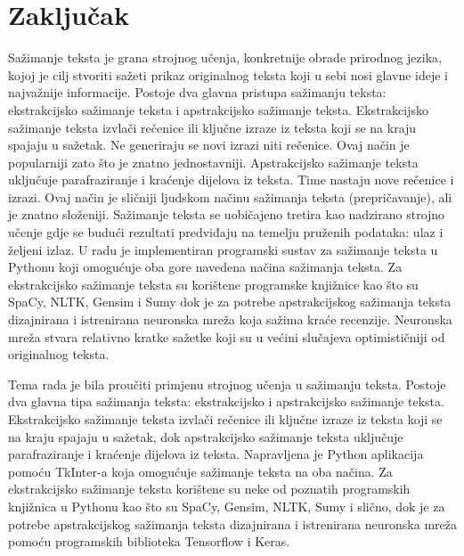 \documentclass[times, utf8, zavrsni, numeric]{fer}
\begin{document}
\chapter{Zaključak}
Sažimanje teksta je grana strojnog učenja, konkretnije obrade prirodnog jezika, kojoj je cilj stvoriti sažeti prikaz originalnog teksta koji u sebi nosi glavne ideje i najvažnije informacije.
Postoje dva glavna pristupa sažimanju teksta: ekstrakcijsko sažimanje teksta i apstrakcijsko sažimanje teksta.
Ekstrakcijsko sažimanje teksta izvlači rečenice ili ključne izraze iz teksta koji se na kraju spajaju u sažetak. Ne generiraju se novi izrazi niti rečenice. Ovaj način je popularniji zato što je znatno jednostavniji.
Apstrakcijsko sažimanje teksta uključuje parafraziranje i kraćenje dijelova iz teksta. Time nastaju nove rečenice i izrazi. Ovaj način je sličniji ljudskom načinu sažimanja teksta (prepričavanje), ali je znatno složeniji.
Sažimanje teksta se uobičajeno tretira kao nadzirano strojno učenje gdje se budući rezultati predviđaju na temelju pruženih podataka: ulaz i željeni izlaz.
U radu je implementiran programski sustav za sažimanje teksta u Pythonu koji omogućuje oba gore navedena načina sažimanja teksta.
Za ekstrakcijsko sažimanje teksta su korištene programske knjižnice kao što su SpaCy, NLTK, Gensim i Sumy dok je za potrebe apstrakcijskog sažimanja teksta dizajnirana i istrenirana neuronska mreža koja sažima kraće recenzije.
Neuronska mreža stvara relativno kratke sažetke koji su u većini slučajeva optimističniji od originalnog teksta.





\begin{sazetak}
Tema rada je bila proučiti primjenu strojnog učenja u sažimanju teksta. Postoje dva glavna tipa sažimanja teksta: ekstrakcijsko i apstrakcijsko sažimanje teksta.
Ekstrakcijsko sažimanje teksta izvlači rečenice ili ključne izraze iz teksta koji se na kraju spajaju u sažetak, dok apstrakcijsko sažimanje teksta uključuje parafraziranje i kraćenje dijelova iz teksta.
Napravljena je Python aplikacija pomoću TkInter-a koja omogućuje sažimanje teksta na oba načina.
Za ekstrakcijsko sažimanje teksta korištene su neke od poznatih programskih knjižnica u Pythonu kao što su SpaCy, Gensim, NLTK, Sumy i slično, dok je za potrebe apstrakcijskog sažimanja teksta dizajnirana i istrenirana neuronska mreža pomoću programskih biblioteka Tensorflow i Keras.


\end{sazetak}
\end{document}
